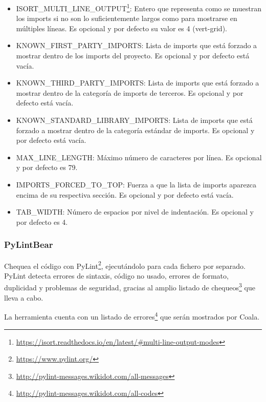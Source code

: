 \documentclass[a4paper, 12pt]{book}
\begin{document}
\begin{itemize}
\begin{itemize}
          \item ISORT\_MULTI\_LINE\_OUTPUT\footnote{\url{https://isort.readthedocs.io/en/latest/#multi-line-output-modes}}: Entero que representa como se muestran los imports si no son lo suficientemente largos como para mostrarse en múltiples líneas. Es opcional y por defecto su valor es 4 (vert-grid).
          \item KNOWN\_FIRST\_PARTY\_IMPORTS: Lista de imports que está forzado a mostrar dentro de los imports del proyecto. Es opcional y por defecto está vacía.
          \item KNOWN\_THIRD\_PARTY\_IMPORTS: Lista de imports que está forzado a mostrar dentro de la categoría de imports de terceros. Es opcional y por defecto está vacía.
          \item KNOWN\_STANDARD\_LIBRARY\_IMPORTS: Lista de imports que está forzado a mostrar dentro de la categoría estándar de imports. Es opcional y por defecto está vacía.
          \item MAX\_LINE\_LENGTH: Máximo número de caracteres por línea. Es opcional y por defecto es 79.
          \item IMPORTS\_FORCED\_TO\_TOP: Fuerza a que la lista de imports aparezca encima de su respectiva sección. Es opcional y por defecto está vacía.
          \item TAB\_WIDTH: Número de espacios por nivel de indentación. Es opcional y por defecto es 4.
    \end{itemize}
\end{itemize}

\subsubsection{PyLintBear}
\label{sec:seccion1.2.10}
Chequea el código con PyLint\footnote{\url{https://www.pylint.org/}}, ejecutándolo para cada fichero por separado. PyLint detecta errores de sintaxis, código no usado, errores de formato, duplicidad y problemas de seguridad, gracias al amplio listado de chequeos\footnote{\url{http://pylint-messages.wikidot.com/all-messages}} que lleva a cabo.

La herramienta cuenta con un listado de errores\footnote{\url{http://pylint-messages.wikidot.com/all-codes}} que serán mostrados por Coala.
\end{document}
